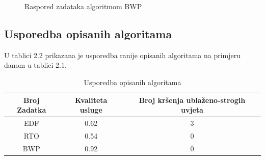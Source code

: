 \documentclass[../zavrsni.tex]{subfiles}
\begin{document}
 \begin{figure}[h!]
    \centering

    \begin{RTGrid}[width=13cm]{3}{24}

    
  
    
  
    

    \end{RTGrid}

    \caption{Raspored zadataka algoritmom BWP}
    \label{fig:ex1}
  \end{figure}

\subsection{Usporedba opisanih algoritama}

U tablici 2.2 prikazana je usporedba ranije opisanih algoritama na primjeru danom u tablici 2.1. 

\begin{table}[h!]
  \begin{center}
    \begin{tabular}{||c || c c ||} 
     \hline
     Broj Zadatka & Kvaliteta usluge & Broj kršenja ublaženo-strogih uvjeta \\ [0.5ex] 
     \hline\hline
     EDF & 0.62 & 3 \\ 
     \hline
     RTO & 0.54 & 0 \\
     \hline
     BWP & 0.92 & 0 \\
     \hline
    \end{tabular}
  \end{center}
  \caption{\label{tab:table-name}Usporedba opisanih algoritama}
  \end{table}
\end{document}
